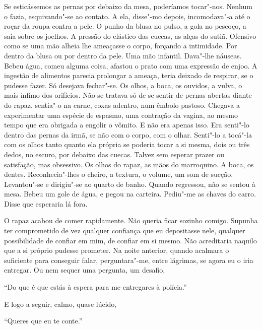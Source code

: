 Se esticássemos as pernas por debaixo da mesa, poderíamos tocar"-nos.
Nenhum o fazia, esquivando"-se ao contato. A ela, disse"-mo depois,
incomodava"-a até o roçar da roupa contra a pele. O punho da blusa no
pulso, a gola no pescoço, a saia sobre os joelhos. A pressão do elástico
das cuecas, as alças do sutiã. Ofensivo como se uma mão alheia lhe
ameaçasse o corpo, forçando a intimidade. Por dentro da blusa ou por
dentro da pele. Uma mão infantil. Dava"-lhe náuseas. Bebeu água, comeu
alguma coisa, afastou o prato com uma expressão de enjoo. A ingestão de
alimentos parecia prolongar a ameaça, teria deixado de respirar, se o
pudesse fazer. Só desejava fechar"-se. Os olhos, a boca, os ouvidos, a
vulva, o mais ínfimo dos orifícios. Não se tratava só de se sentir de
pernas abertas diante do rapaz, sentia"-o na carne, coxas adentro, num
êmbolo pastoso. Chegava a experimentar uma espécie de espasmo, uma
contração da vagina, ao mesmo tempo que era obrigada a engolir o
vômito. E não era apenas isso. Era senti"-lo dentro das pernas da irmã,
se não com o corpo, com o olhar. Senti"-lo a tocá"-la com os olhos tanto
quanto ela própria se poderia tocar a si mesma, dois ou três dedos, no
escuro, por debaixo das cuecas. Talvez sem esperar prazer ou satisfação,
mas obsessivo. Os olhos do rapaz, as mãos do marroquino. A boca, os
dentes. Reconhecia"-lhes o cheiro, a textura, o volume, um som de
sucção. Levantou"-se e dirigiu"-se ao quarto de banho. Quando regressou,
não se sentou à mesa. Bebeu um gole de água, e pegou na carteira.
Pediu"-me as chaves do carro. Disse que esperaria lá fora.

O rapaz acabou de comer rapidamente. Não queria ficar sozinho comigo.
Supunha ter comprometido de vez qualquer confiança que eu depositasse
nele, qualquer possibilidade de confiar em mim, de confiar em si mesmo.
Não acreditaria naquilo que a si próprio pudesse prometer. Na noite
anterior, quando acalmara o suficiente para conseguir falar,
perguntara"-me, entre lágrimas, se agora eu o iria entregar. Ou nem
sequer uma pergunta, um desafio,

``Do que é que estás à espera para me entregares à polícia.''

E logo a seguir, calmo, quase lúcido,

``Queres que eu te conte.''

